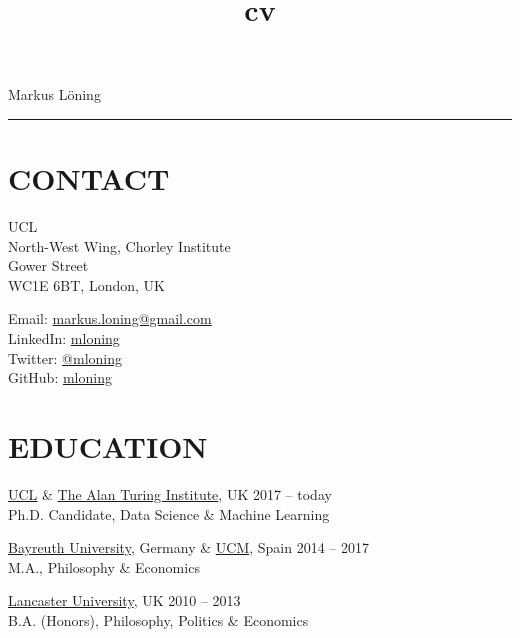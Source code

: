 \documentclass{cv}
\title{cv}
\begin{document}
{\LARGE Markus Löning}
\vspace{12pt}
\hrule

\section{CONTACT}

\begin{minipage}{.44\textwidth}
\vspace{3pt}
{\raggedright{} UCL \\
North-West Wing, Chorley Institute \\
Gower Street \\
WC1E 6BT, London, UK}
\end{minipage}
\hspace{1.25cm}
\begin{minipage}{.44\textwidth}
\vspace{3pt}
Email: \href{mailto:markus.loning@gmail.com}{markus.loning@gmail.com} \\
LinkedIn: \href{https://linkedin.com/in/mloning}{mloning} \\
Twitter: \href{https://twitter.com/mloning_}{@mloning\textunderscore} \\
GitHub: \href{https://github.com/mloning}{mloning}
\end{minipage}


\section{EDUCATION}

\href{https://www.ucl.ac.uk/}{UCL} \& \href{https://www.turing.ac.uk/}{The Alan Turing Institute}, UK \hfill 2017 -- today \\
Ph.D. Candidate, Data Science \& Machine Learning 
\vspace{15pt}

\href{https://www.uni-bayreuth.de/en/}{Bayreuth University}, Germany \& \href{https://www.ucm.es/english}{UCM}, Spain \hfill 2014 -- 2017 \\
M.A., Philosophy \& Economics 
\vspace{15pt}

\href{https://www.lancs.ac.uk/}{Lancaster University}, UK \hfill 2010 -- 2013 \\
B.A. (Honors), Philosophy, Politics \& Economics 
\end{document}
